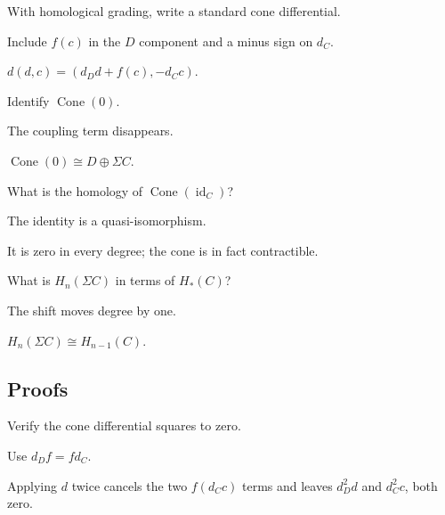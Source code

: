\begin{exercise}\label{exr:viii24-ped-02}
With homological grading, write a standard cone differential.
\end{exercise}
\begin{hint}
Include $f(c)$ in the $D$ component and a minus sign on $d_C$.
\end{hint}
\begin{solution}
$d(d,c)=(d_Dd+f(c),-d_Cc)$.
\end{solution}

\begin{exercise}\label{exr:viii24-ped-03}
Identify $\operatorname{Cone}(0)$.
\end{exercise}
\begin{hint}
The coupling term disappears.
\end{hint}
\begin{solution}
$\operatorname{Cone}(0)\cong D\oplus\Sigma C$.
\end{solution}

\begin{exercise}\label{exr:viii24-ped-04}
What is the homology of $\operatorname{Cone}(\operatorname{id}_C)$?
\end{exercise}
\begin{hint}
The identity is a quasi-isomorphism.
\end{hint}
\begin{solution}
It is zero in every degree; the cone is in fact contractible.
\end{solution}

\begin{exercise}\label{exr:viii24-ped-05}
What is $H_n(\Sigma C)$ in terms of $H_*(C)$?
\end{exercise}
\begin{hint}
The shift moves degree by one.
\end{hint}
\begin{solution}
$H_n(\Sigma C)\cong H_{n-1}(C)$.
\end{solution}

\subsection*{Proofs}

\begin{exercise}[Check $d^2=0$]\label{exr:viii24-ped-06}
Verify the cone differential squares to zero.
\end{exercise}
\begin{hint}
Use $d_Df=fd_C$.
\end{hint}
\begin{solution}
Applying $d$ twice cancels the two $f(d_Cc)$ terms and leaves $d_D^2d$ and $d_C^2c$, both zero.
\end{solution}

